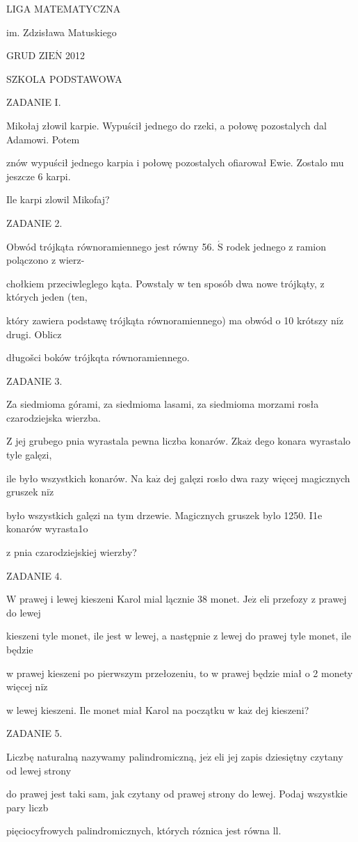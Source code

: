 \documentclass[a4paper,12pt]{article}
\begin{document}
LIGA MATEMATYCZNA

im. Zdzisława Matuskiego

GRUD Z$\mathrm{I}\mathrm{E}\acute{\mathrm{N}}$ 2012

SZKOLA PODSTAWOWA

ZADANIE I.

Mikołaj złowil karpie. Wypuścił jednego do rzeki, a połowę pozostalych dal Adamowi. Potem

znów wypuścił jednego karpia i połowę pozostalych ofiarował Ewie. Zostalo mu jeszcze 6 karpi.

Ile karpi zlowil Mikofaj?

ZADANIE 2.

Obwód trójkąta równoramiennego jest równy 56. $\acute{\mathrm{S}}$ rodek jednego z ramion polączono z wierz-

chołkiem przeciwleglego kąta. Powstaly w ten sposób dwa nowe trójkąty, z których jeden (ten,

który zawiera podstawę trójkąta równoramiennego) ma obwód o 10 krótszy $\mathrm{n}\mathrm{i}\dot{\mathrm{z}}$ drugi. Oblicz

długošci boków trójkqta równoramiennego.

ZADANIE 3.

Za siedmioma górami, za siedmioma lasami, za siedmioma morzami rosła czarodziejska wierzba.

$\mathrm{Z}$ jej grubego pnia wyrastala pewna liczba konarów. $\mathrm{Z}\mathrm{k}\mathrm{a}\dot{\mathrm{z}}$ dego konara wyrastalo tyle galęzi,

ile było wszystkich konarów. Na $\mathrm{k}\mathrm{a}\dot{\mathrm{z}}$ dej galęzi rosło dwa razy więcej magicznych gruszek $\mathrm{n}\mathrm{i}\dot{\mathrm{z}}$

było wszystkich galęzi na tym drzewie. Magicznych gruszek bylo 1250. I1e konarów wyrasta1o

z pnia czarodziejskiej wierzby?

ZADANIE 4.

$\mathrm{W}$ prawej i lewej kieszeni Karol mial lącznie 38 monet. $\mathrm{J}\mathrm{e}\dot{\mathrm{z}}$ eli przefozy z prawej do lewej

kieszeni tyle monet, ile jest w lewej, a następnie z lewej do prawej tyle monet, ile będzie

w prawej kieszeni po pierwszym przełozeniu, to w prawej będzie miał o 2 monety więcej $\mathrm{n}\mathrm{i}\dot{\mathrm{z}}$

w lewej kieszeni. Ile monet miał Karol na początku w $\mathrm{k}\mathrm{a}\dot{\mathrm{z}}$ dej kieszeni?

ZADANIE 5.

Liczbę naturalną nazywamy palindromiczną, $\mathrm{j}\mathrm{e}\dot{\mathrm{z}}$ eli jej zapis dziesiętny czytany od lewej strony

do prawej jest taki sam, jak czytany od prawej strony do lewej. Podaj wszystkie pary liczb

pięciocyfrowych palindromicznych, których róznica jest równa ll.
\end{document}
